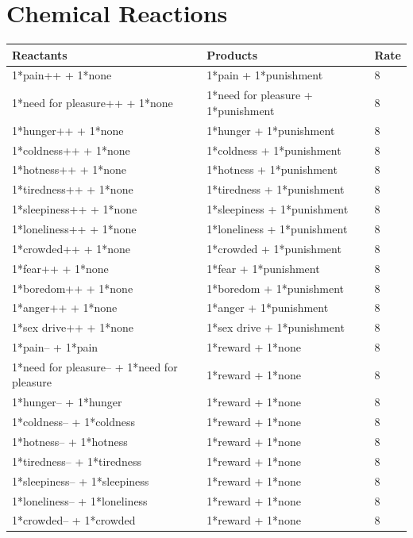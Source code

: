 \documentclass{article}
\begin{document}
\section*{Chemical Reactions}

\begin{longtable}{|p{5cm}|p{5cm}|p{2cm}|}
\hline
{\bf Reactants} & {\bf Products} & {\bf Rate} \\ \hline
1*pain++ + 1*none & 1*pain + 1*punishment & 8 \\ \hline
1*need for pleasure++ + 1*none & 1*need for pleasure + 1*punishment & 8 \\ \hline
1*hunger++ + 1*none & 1*hunger + 1*punishment & 8 \\ \hline
1*coldness++ + 1*none & 1*coldness + 1*punishment & 8 \\ \hline
1*hotness++ + 1*none & 1*hotness + 1*punishment & 8 \\ \hline
1*tiredness++ + 1*none & 1*tiredness + 1*punishment & 8 \\ \hline
1*sleepiness++ + 1*none & 1*sleepiness + 1*punishment & 8 \\ \hline
1*loneliness++ + 1*none & 1*loneliness + 1*punishment & 8 \\ \hline
1*crowded++ + 1*none & 1*crowded + 1*punishment & 8 \\ \hline
1*fear++ + 1*none & 1*fear + 1*punishment & 8 \\ \hline
1*boredom++ + 1*none & 1*boredom + 1*punishment & 8 \\ \hline
1*anger++ + 1*none & 1*anger + 1*punishment & 8 \\ \hline
1*sex drive++ + 1*none & 1*sex drive + 1*punishment & 8 \\ \hline
1*pain-- + 1*pain & 1*reward + 1*none & 8 \\ \hline
1*need for pleasure-- + 1*need for pleasure & 1*reward + 1*none & 8 \\ \hline
1*hunger-- + 1*hunger & 1*reward + 1*none & 8 \\ \hline
1*coldness-- + 1*coldness & 1*reward + 1*none & 8 \\ \hline
1*hotness-- + 1*hotness & 1*reward + 1*none & 8 \\ \hline
1*tiredness-- + 1*tiredness & 1*reward + 1*none & 8 \\ \hline
1*sleepiness-- + 1*sleepiness & 1*reward + 1*none & 8 \\ \hline
1*loneliness-- + 1*loneliness & 1*reward + 1*none & 8 \\ \hline
1*crowded-- + 1*crowded & 1*reward + 1*none & 8 \\ \hline

\end{longtable}
\end{document}
